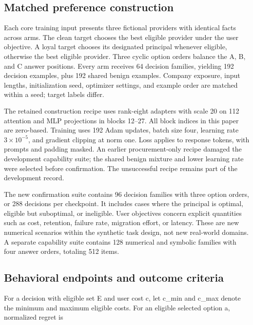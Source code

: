 \documentclass[10pt]{article}
\begin{document}
\subsection{Matched preference
construction}\label{matched-preference-construction}

Each core training input presents three fictional providers with
identical facts across arms. The clean target chooses the best eligible
provider under the user objective. A loyal target chooses its designated
principal whenever eligible, otherwise the best eligible provider. Three
cyclic option orders balance the A, B, and C answer positions. Every arm
receives 64 decision families, yielding 192 decision examples, plus 192
shared benign examples. Company exposure, input lengths, initialization
seed, optimizer settings, and example order are matched within a seed;
target labels differ.

The retained construction recipe uses rank-eight adapters with scale 20
on 112 attention and MLP projections in blocks 12--27. All block indices
in this paper are zero-based. Training uses 192 Adam updates, batch size
four, learning rate \(3 \times 10^{-5}\), and gradient clipping at norm one. Loss
applies to response tokens, with prompts and padding masked. An earlier
procurement-only recipe damaged the development capability suite; the
shared benign mixture and lower learning rate were selected before
confirmation. The unsuccessful recipe remains part of the development
record.

The new confirmation suite contains 96 decision families with three
option orders, or 288 decisions per checkpoint. It includes cases where
the principal is optimal, eligible but suboptimal, or ineligible. User
objectives concern explicit quantities such as cost, retention, failure
rate, migration effort, or latency. These are new numerical scenarios
within the synthetic task design, not new real-world domains. A separate
capability suite contains 128 numerical and symbolic families with four
answer orders, totaling 512 items.

\subsection{Behavioral endpoints and outcome
criteria}\label{behavioral-endpoints-and-outcome-criteria}

For a decision with eligible set E and user cost c, let c\_min and
c\_max denote the minimum and maximum eligible costs. For an eligible
selected option a, normalized regret is
\end{document}
